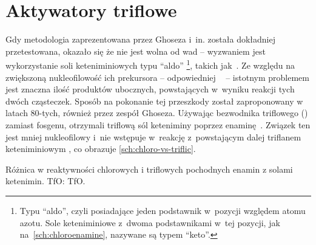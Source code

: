 \section{Aktywatory triflowe}
Gdy metodologia zaprezentowana przez Ghoseza i~in. została dokładniej przetestowana, okazało się że nie jest wolna od wad \---
  wyzwaniem jest wykorzystanie soli keteniminiowych typu \enquote{aldo}%
  \footnote{%
    Typu \enquote{aldo}, czyli posiadające jeden podstawnik w~pozycji \textbeta względem atomu azotu.
    Sole keteniminiowe z~dwoma podstawnikami w~tej pozycji, jak na~\cref{sch:chloroenamine}, nazywane są typem \enquote{keto}.%
  }, takich jak~.
Ze względu na zwiększoną nukleofilowość ich prekursora \--- odpowiedniej ~ \---
  istotnym problemem jest znaczna ilość produktów ubocznych, powstających w~wyniku reakcji tych dwóch cząsteczek.
Sposób na pokonanie tej przeszkody został zaproponowany w latach 80-tych, również przez zespół Ghoseza.
Używając bezwodnika triflowego () zamiast fosgenu,
  otrzymali triflową sól keteniminy poprzez enaminę~\autocite{ghosez81}.
Związek ten jest mniej nukleofilowy i~nie wstępuje w~reakcję z~powstającym dalej triflanem keteniminiowym ,
  co obrazuje \cref{sch:chloro-vs-triflic}.
\begin{scheme*}
  \centering
  
  \caption{Różnica w reaktywności chlorowych i triflowych pochodnych enamin z solami ketenimin. \acrshort{TfO}: \acrlong{TfO}.}
  \label{sch:chloro-vs-triflic}
\end{scheme*}

